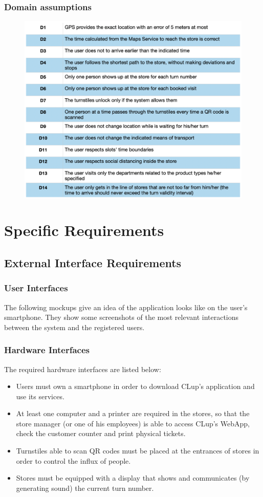 \documentclass{article}
\begin{document}
\subsubsection{Domain assumptions}
\begin{figure}[H]
  \includegraphics[width=\linewidth]{Domains.png}
  
\end{figure}

\section{Specific Requirements}
\subsection{External Interface Requirements}
\subsubsection{User Interfaces}
The following mockups give an idea of the application looks like on the user’s smartphone. They show some screenshots of the most relevant interactions between the system and the registered users.
\subsubsection{Hardware Interfaces}
The required hardware interfaces are listed below:
\begin{itemize}
\item Users must own a smartphone in order to download CLup’s application and use its services.
\item At least one computer and a printer are required in the stores, so that the store manager (or one of his employees) is able to access CLup’s WebApp, check the customer counter and print physical tickets.
\item Turnstiles able to scan QR codes must be placed at the entrances of stores in order to control the influx of people.
\item Stores must be equipped with a display that shows and communicates (by generating sound) the current turn number.
\end{itemize}
\end{document}
